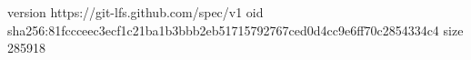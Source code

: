version https://git-lfs.github.com/spec/v1
oid sha256:81fccceec3ecf1c21ba1b3bbb2eb51715792767ced0d4cc9e6ff70c2854334c4
size 285918
